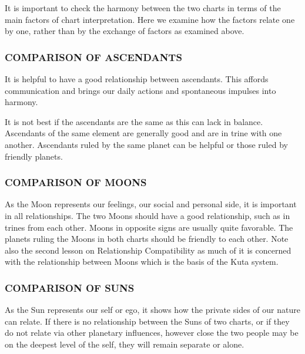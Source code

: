 It is important to check the harmony between the two charts in terms of the main factors of chart interpretation. Here we examine how the factors relate one by one, rather than by the exchange of factors as examined above.

 

\subsubsection{COMPARISON OF ASCENDANTS}

 

It is helpful to have a good relationship between ascendants. This affords communication and brings our daily actions and spontaneous impulses into harmony.

It is not best if the ascendants are the same as this can lack in balance. Ascendants of the same element are generally good and are in trine with one another. Ascendants ruled by the same planet can be helpful or those ruled by friendly planets.

 

\subsubsection{COMPARISON OF MOONS}

 

As the Moon represents our feelings, our social and personal side, it is important in all relationships. The two Moons should have a good relationship, such as in trines from each other. Moons in opposite signs are usually quite favorable. The planets ruling the Moons in both charts should be friendly to each other. Note also the second lesson on Relationship Compatibility as much of it is concerned with the relationship between Moons which is the basis of the Kuta system.

 

\subsubsection{COMPARISON OF SUNS}

 

As the Sun represents our self or ego, it shows how the private sides of our nature can relate. If there is no relationship between the Suns of two charts, or if they do not relate via other planetary influences, however close the two people may be on the deepest level of the self, they will remain separate or alone.

